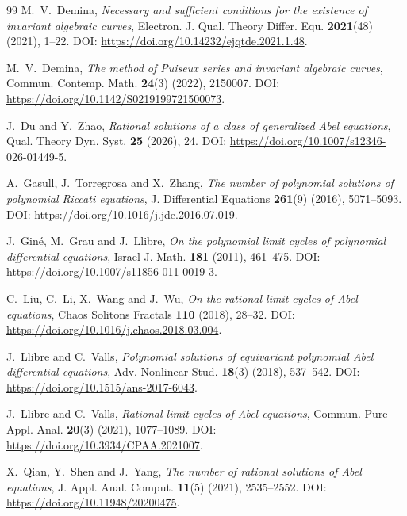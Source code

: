 \documentclass[12pt,a4paper]{amsart}
\numberwithin{theorem}{section}
\theoremstyle{definition}
\begin{document}
\begin{thebibliography}{99}
		M.~V.~Demina,
		\newblock \emph{Necessary and sufficient conditions for the existence of invariant algebraic curves},
		\newblock Electron. J. Qual. Theory Differ. Equ. \textbf{2021}(48) (2021), 1--22.
		\newblock DOI: \url{https://doi.org/10.14232/ejqtde.2021.1.48}.
		
		M.~V.~Demina,
		\newblock \emph{The method of Puiseux series and invariant algebraic curves},
		\newblock Commun. Contemp. Math. \textbf{24}(3) (2022), 2150007.
		\newblock DOI: \url{https://doi.org/10.1142/S0219199721500073}.
		
		J.~Du and Y.~Zhao,
		\newblock \emph{Rational solutions of a class of generalized Abel equations},
		\newblock Qual. Theory Dyn. Syst. \textbf{25} (2026), 24.
		\newblock DOI: \url{https://doi.org/10.1007/s12346-026-01449-5}.
		
		A.~Gasull, J.~Torregrosa and X.~Zhang,
		\newblock \emph{The number of polynomial solutions of polynomial Riccati equations},
		\newblock J. Differential Equations \textbf{261}(9) (2016), 5071--5093.
		\newblock DOI: \url{https://doi.org/10.1016/j.jde.2016.07.019}.
		
		J.~Gin\'e, M.~Grau and J.~Llibre,
		\newblock \emph{On the polynomial limit cycles of polynomial differential equations},
		\newblock Israel J. Math. \textbf{181} (2011), 461--475.
		\newblock DOI: \url{https://doi.org/10.1007/s11856-011-0019-3}.
		
		C.~Liu, C.~Li, X.~Wang and J.~Wu,
		\newblock \emph{On the rational limit cycles of Abel equations},
		\newblock Chaos Solitons Fractals \textbf{110} (2018), 28--32.
		\newblock DOI: \url{https://doi.org/10.1016/j.chaos.2018.03.004}.
		
		J.~Llibre and C.~Valls,
		\newblock \emph{Polynomial solutions of equivariant polynomial Abel differential equations},
		\newblock Adv. Nonlinear Stud. \textbf{18}(3) (2018), 537--542.
		\newblock DOI: \url{https://doi.org/10.1515/ans-2017-6043}.
		
		J.~Llibre and C.~Valls,
		\newblock \emph{Rational limit cycles of Abel equations},
		\newblock Commun. Pure Appl. Anal. \textbf{20}(3) (2021), 1077--1089.
		\newblock DOI: \url{https://doi.org/10.3934/CPAA.2021007}.
		
		X.~Qian, Y.~Shen and J.~Yang,
		\newblock \emph{The number of rational solutions of Abel equations},
		\newblock J. Appl. Anal. Comput. \textbf{11}(5) (2021), 2535--2552.
		\newblock DOI: \url{https://doi.org/10.11948/20200475}.
		

\end{thebibliography}
\end{document}
